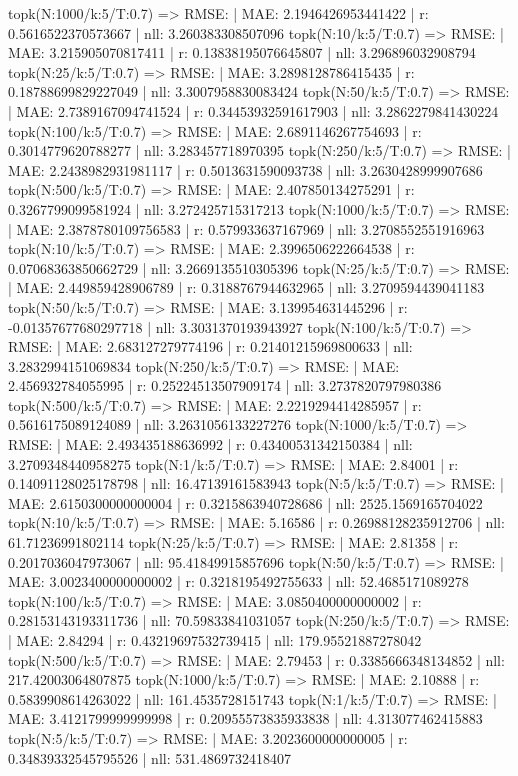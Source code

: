 topk(N:1000/k:5/T:0.7) => RMSE: | MAE: 2.1946426953441422 | r: 0.5616522370573667 | nll: 3.260383308507096
topk(N:10/k:5/T:0.7) => RMSE: | MAE: 3.215905070817411 | r: 0.13838195076645807 | nll: 3.296896032908794
topk(N:25/k:5/T:0.7) => RMSE: | MAE: 3.2898128786415435 | r: 0.18788699829227049 | nll: 3.3007958830083424
topk(N:50/k:5/T:0.7) => RMSE: | MAE: 2.7389167094741524 | r: 0.34453932591617903 | nll: 3.2862279841430224
topk(N:100/k:5/T:0.7) => RMSE: | MAE: 2.6891146267754693 | r: 0.3014779620788277 | nll: 3.283457718970395
topk(N:250/k:5/T:0.7) => RMSE: | MAE: 2.2438982931981117 | r: 0.5013631590093738 | nll: 3.2630428999907686
topk(N:500/k:5/T:0.7) => RMSE: | MAE: 2.407850134275291 | r: 0.3267799099581924 | nll: 3.272425715317213
topk(N:1000/k:5/T:0.7) => RMSE: | MAE: 2.3878780109756583 | r: 0.579933637167969 | nll: 3.2708552551916963
topk(N:10/k:5/T:0.7) => RMSE: | MAE: 2.3996506222664538 | r: 0.07068363850662729 | nll: 3.2669135510305396
topk(N:25/k:5/T:0.7) => RMSE: | MAE: 2.449859428906789 | r: 0.3188767944632965 | nll: 3.2709594439041183
topk(N:50/k:5/T:0.7) => RMSE: | MAE: 3.139954631445296 | r: -0.01357677680297718 | nll: 3.3031370193943927
topk(N:100/k:5/T:0.7) => RMSE: | MAE: 2.683127279774196 | r: 0.21401215969800633 | nll: 3.2832994151069834
topk(N:250/k:5/T:0.7) => RMSE: | MAE: 2.456932784055995 | r: 0.25224513507909174 | nll: 3.2737820797980386
topk(N:500/k:5/T:0.7) => RMSE: | MAE: 2.2219294414285957 | r: 0.5616175089124089 | nll: 3.2631056133227276
topk(N:1000/k:5/T:0.7) => RMSE: | MAE: 2.493435188636992 | r: 0.43400531342150384 | nll: 3.2709348440958275
topk(N:1/k:5/T:0.7) => RMSE: | MAE: 2.84001 | r: 0.14091128025178798 | nll: 16.47139161583943
topk(N:5/k:5/T:0.7) => RMSE: | MAE: 2.6150300000000004 | r: 0.3215863940728686 | nll: 2525.1569165704022
topk(N:10/k:5/T:0.7) => RMSE: | MAE: 5.16586 | r: 0.26988128235912706 | nll: 61.71236991802114
topk(N:25/k:5/T:0.7) => RMSE: | MAE: 2.81358 | r: 0.2017036047973067 | nll: 95.41849915857696
topk(N:50/k:5/T:0.7) => RMSE: | MAE: 3.0023400000000002 | r: 0.3218195492755633 | nll: 52.4685171089278
topk(N:100/k:5/T:0.7) => RMSE: | MAE: 3.0850400000000002 | r: 0.28153143193311736 | nll: 70.59833841031057
topk(N:250/k:5/T:0.7) => RMSE: | MAE: 2.84294 | r: 0.43219697532739415 | nll: 179.95521887278042
topk(N:500/k:5/T:0.7) => RMSE: | MAE: 2.79453 | r: 0.3385666348134852 | nll: 217.42003064807875
topk(N:1000/k:5/T:0.7) => RMSE: | MAE: 2.10888 | r: 0.5839908614263022 | nll: 161.4535728151743
topk(N:1/k:5/T:0.7) => RMSE: | MAE: 3.4121799999999998 | r: 0.20955573835933838 | nll: 4.313077462415883
topk(N:5/k:5/T:0.7) => RMSE: | MAE: 3.2023600000000005 | r: 0.34839332545795526 | nll: 531.4869732418407
